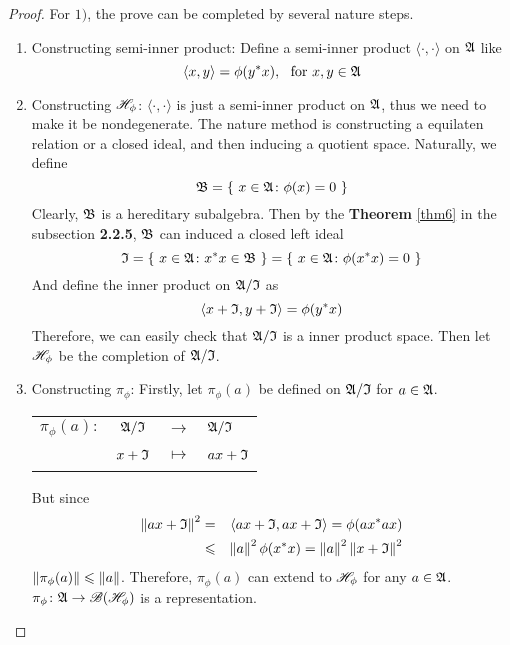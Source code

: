 \documentclass[a4paper,11pt]{report}
\begin{document}
\begin{proof}
	For $1)$, the prove can be completed by several nature steps.
	\begin{enumerate}[label=\arabic*)]
		\item Constructing semi-inner product: Define a semi-inner product $\langle \cdot, \cdot \rangle$ on $\mathfrak{A}$ like
		\begin{equation*}
			\langle x,y \rangle = \phi(y^{*}x),~~ \text{for}~ x,y \in \mathfrak{A}
		\end{equation*}
		\item Constructing $\mathscr{H}_{\phi}$: $\langle \cdot, \cdot \rangle$ is just a semi-inner product on $\mathfrak{A}$, thus we need to make it be nondegenerate. The nature method is constructing a equilaten relation or a closed ideal, and then inducing a quotient space. Naturally, we define
		\begin{equation*}
			\mathfrak{B} = \{~x \in \mathfrak{A} \colon \phi(x) = 0~\}
		\end{equation*}
		Clearly, $\mathfrak{B}$ is a hereditary subalgebra. Then by the \textbf{Theorem} \ref{thm6} in the subsection \textbf{2.2.5}, $\mathfrak{B}$ can induced a closed left ideal
		\begin{equation*}
			\mathfrak{I} = \{~x \in \mathfrak{A} \colon x^{*}x \in \mathfrak{B}~\} = \{~x \in \mathfrak{A} \colon \phi(x^{*}x) = 0~\}
		\end{equation*}
		And define the inner product on $\mathfrak{A} / \mathfrak{I}$ as
		\begin{equation*}
			\langle x+\mathfrak{I},y+\mathfrak{I} \rangle = \phi(y^{*}x)
		\end{equation*}
		Therefore, we can easily check that $\mathfrak{A} / \mathfrak{I}$ is a inner product space. Then let $\mathscr{H}_{\phi}$ be the completion of $\mathfrak{A} / \mathfrak{I}$.
		\item Constructing $\pi_{\phi}$: Firstly, let $\pi_{\phi}(a)$ be defined on $\mathfrak{A} / \mathfrak{I}$ for $a \in \mathfrak{A}$.
		\begin{center}
		\begin{tabular}{l c c l}
			$\pi_{\phi}(a) \colon$ & $\mathfrak{A} / \mathfrak{I}$ & $\longrightarrow$ & $\mathfrak{A} / \mathfrak{I}$ \\
			~ & $x+\mathfrak{I}$ & $\longmapsto$ & $ax+\mathfrak{I}$
		\end{tabular}
		\end{center}
		But since
		\begin{eqnarray*}
			\left\lVert ax+\mathfrak{I}\right\lVert^2 &=& \langle ax+\mathfrak{I},ax+\mathfrak{I} \rangle = \phi(ax^{*}ax) \\
		 	&\leqslant& \left\lVert a\right\lVert^2 \phi(x^{*}x) = \left\lVert a\right\lVert^2\left\lVert x+\mathfrak{I}\right\lVert^2
		\end{eqnarray*}
		$\left\lVert\pi_{\phi}(a)\right\lVert \leqslant \left\lVert a\right\lVert$. Therefore, $\pi_{\phi}(a)$ can extend to $\mathscr{H}_{\phi}$ for any $a \in \mathfrak{A}$. $\pi_{\phi} \colon \mathfrak{A} \rightarrow \mathscr{B}(\mathscr{H}_{\phi})$ is a representation.

\end{enumerate}
\end{proof}
\end{document}
